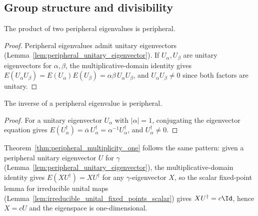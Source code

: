 \subsection{Group structure and divisibility}

\begin{lemma}
    \label{lem:peripheral_closed_under_mul_group}
    \leanok
    The product of two peripheral eigenvalues is peripheral.
\end{lemma}

\begin{proof}\leanok
    Peripheral eigenvalues admit unitary eigenvectors
    (Lemma~\ref{lem:peripheral_unitary_eigenvector}). If $U_\alpha,U_\beta$
    are unitary eigenvectors for $\alpha,\beta$, the multiplicative-domain
    identity gives
    $E(U_\alpha U_\beta)=E(U_\alpha)E(U_\beta)=\alpha\beta\,U_\alpha U_\beta$,
    and $U_\alpha U_\beta\neq0$ since both factors are unitary.
\end{proof}

\begin{lemma}
    \label{lem:peripheral_closed_under_inv_group}
    \leanok
    The inverse of a peripheral eigenvalue is peripheral.
\end{lemma}

\begin{proof}\leanok
    For a unitary eigenvector $U_\alpha$ with $|\alpha|=1$, conjugating the
    eigenvector equation gives
    $E(U_\alpha^\dagger)=\overline\alpha\,U_\alpha^\dagger
        =\alpha^{-1}U_\alpha^\dagger$, and $U_\alpha^\dagger\neq0$.
\end{proof}

Theorem~\ref{thm:peripheral_multiplicity_one} follows the same pattern:
given a peripheral unitary eigenvector $U$ for $\gamma$
(Lemma~\ref{lem:peripheral_unitary_eigenvector}), the multiplicative-domain
identity gives $E(XU^\dagger)=XU^\dagger$ for any $\gamma$-eigenvector $X$,
so the scalar fixed-point lemma for irreducible unital maps
(Lemma~\ref{lem:irreducible_unital_fixed_points_scalar}) gives
$XU^\dagger=c\Id$, hence $X=cU$ and the eigenspace is one-dimensional.

